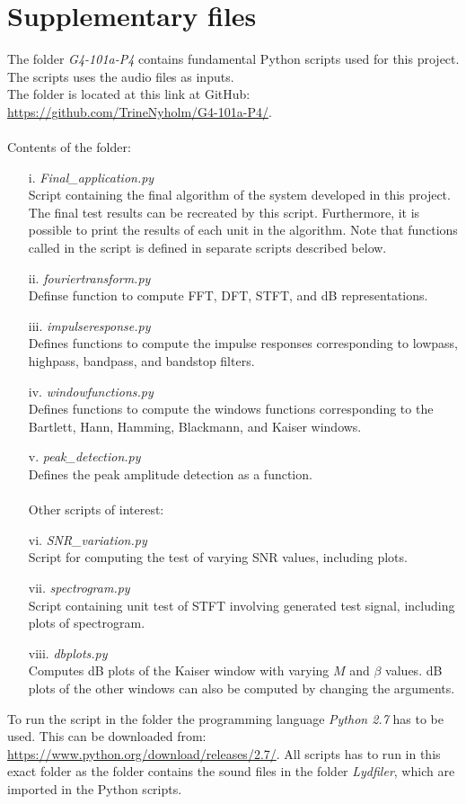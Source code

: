 \clearpage
\chapter{Supplementary files} \label{app:sup}
The folder \textit{G4-101a-P4} contains fundamental Python scripts used for this project. The scripts uses the audio files as inputs. 
\\
The folder is located at this link at GitHub: \url{https://github.com/TrineNyholm/G4-101a-P4/}.  \\
\\
Contents of the folder:
\begin{itemize}
\item[i.]\textit{Final\_application.py} \\
Script containing the final algorithm of the system developed in this project. The final test results can be recreated by this script. Furthermore, it is possible to print the results of each unit in the algorithm. Note that functions called in the script is defined in separate scripts described below.   

\item[ii.]\textit{fouriertransform.py}\\
Definse function to compute FFT, DFT, STFT, and dB representations.
 
\item[iii.] \textit{impulseresponse.py}\\
Defines functions to compute the impulse responses corresponding to lowpass, highpass, bandpass, and bandstop filters.
\item[iv.] \textit{windowfunctions.py}\\
Defines functions to compute the windows functions corresponding to the Bartlett, Hann, Hamming, Blackmann, and Kaiser windows. 
\item[v.] \textit{peak\_detection.py} \\
Defines the peak amplitude detection as a function.
\\
\\
Other scripts of interest:
\item[vi.] \textit{SNR\_variation.py} \\
Script for computing the test of varying SNR values, including plots.  
\item[vii.]\textit{spectrogram.py}\\
Script containing unit test of STFT involving generated test signal, including plots of spectrogram. 
\item[viii.] \textit{dbplots.py} \\
Computes dB plots of the Kaiser window with varying $M$ and $\beta$ values. dB plots of the other windows can also be computed by changing the arguments.
\end{itemize}

To run the script in the folder the programming language \textit{Python 2.7} has to be used. This can be downloaded from: \url{https://www.python.org/download/releases/2.7/}. All scripts has to run in this exact folder as the folder contains the sound files in the folder \textit{Lydfiler}, which are imported in the Python scripts.